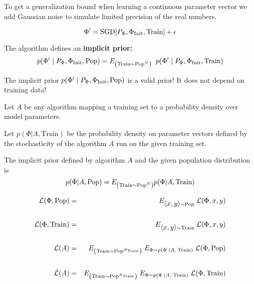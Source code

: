 {To get a generalization bound when learning a continuous parameter vector we add Gaussian noise to simulate limited precision of the real numbers.

$$\Phi' = \mathrm{SGD}\!\left[P_\Phi,\Phi_{\mathrm{Init}},\mathrm{Train}\right] + \epsilon$$

\vfill
The algorithm defines an {\bf implicit prior:}
$$p\!\left(\Phi'\;|\;P_\Phi,\Phi_{\mathrm{Init}},\mathrm{Pop}\right) = E_{\left(\mathrm{Train} \sim \mathrm{Pop}^N\right)}\;\;p\!\left(\Phi'\;|\;P_\Phi,\Phi_{\mathrm{Init}},\mathrm{Train}\right)$$

\vfill
The implicit prior $p\!\left(\Phi'\;|\;P_\Phi,\Phi_{\mathrm{Init}},\mathrm{Pop}\right)$ is a valid prior!  It does not depend on training data!


Let $A$ be any algorithm mapping a training set to a probability density over model parameters.

\vfill
Let $p(\Phi|A,\mathrm{Train})$ be the probability density on parameter vectors defined by the stochasticity of the algorithm $A$ run on the given training set.

\vfill
The implicit prior defined by algorithm $A$ and the given population distribution is
$$p(\Phi|A,\mathrm{Pop}) = E_{\left(\mathrm{Train} \sim \mathrm{Pop}^{N}\right)} p(\Phi|A,\mathrm{Train})$$


\begin{eqnarray*}
{\cal L}(\Phi,\mathrm{Pop}) & = & E_{{\mbox{$\langle x,y\rangle$}} \sim \mathrm{Pop}}\;{\cal L}(\Phi,x,y) \\
\\
{\cal L}(\Phi,\mathrm{Train}) & = & E_{{\mbox{$\langle x,y\rangle$}} \sim \mathrm{Train}}\;{\cal L}(\Phi,x,y) \\
\\
{\cal L}(A) & = & E_{\left(\mathrm{Train} \sim \mathrm{Pop}^{N_\mathrm{Train}}\right)}\;E_{\Phi \sim p(\Phi\;|A,\;\mathrm{Train})}\;{\cal L}(\Phi,\mathrm{Pop}) \\
\\
\hat{\cal L}(A) & = & E_{\left(\mathrm{Train} \sim \mathrm{Pop}^{N_\mathrm{Train}}\right)}\;E_{\Phi \sim p(\Phi\;|A,\;\mathrm{Train})}\;{\cal L}(\Phi,\mathrm{Train})
\end{eqnarray*}

}
